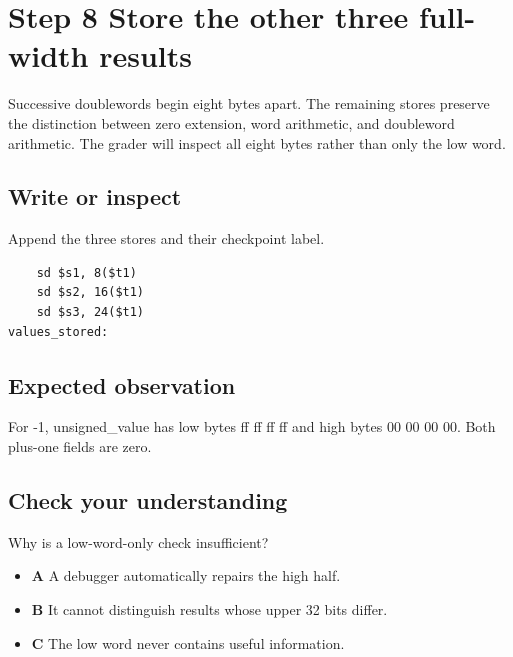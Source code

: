 \section{Step 8 Store the other three full-width
  results}\label{004-bit-inspector-s08-step-8-store-the-other-three-full-width-results}

Successive doublewords begin eight bytes apart. The remaining stores
preserve the distinction between zero extension, word arithmetic, and
doubleword arithmetic. The grader will inspect all eight bytes rather
than only the low word.

\subsection{Write or
  inspect}\label{004-bit-inspector-s08-write-or-inspect}

Append the three stores and their checkpoint label.

\begin{verbatim}
    sd $s1, 8($t1)
    sd $s2, 16($t1)
    sd $s3, 24($t1)
values_stored:
\end{verbatim}

\subsection{Expected
  observation}\label{004-bit-inspector-s08-expected-observation}

For -1, unsigned\_value has low bytes ff ff ff ff and high bytes 00 00
00 00. Both plus-one fields are zero.

\subsection{Check your
  understanding}\label{004-bit-inspector-s08-check-your-understanding}

Why is a low-word-only check insufficient?

\begin{itemize}
  \tightlist
  \item
        \textbf{A} A debugger automatically repairs the high half.
  \item
        \textbf{B} It cannot distinguish results whose upper 32 bits differ.
  \item
        \textbf{C} The low word never contains useful information.
\end{itemize}
